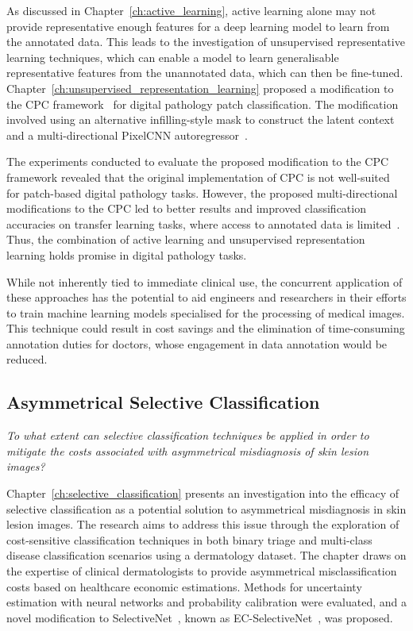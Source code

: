 As discussed in Chapter~\ref{ch:active_learning}, active learning alone may not provide representative enough features for a deep learning model to learn from the annotated data. This leads to the investigation of unsupervised representative learning techniques, which can enable a model to learn generalisable representative features from the unannotated data, which can then be fine-tuned. Chapter~\ref{ch:unsupervised_representation_learning} proposed a modification to the CPC framework~\citep{oord2018representation} for digital pathology patch classification. The modification involved using an alternative infilling-style mask to construct the latent context and a multi-directional PixelCNN autoregressor~\citep{oord2016pixel}.

The experiments conducted to evaluate the proposed modification to the CPC framework revealed that the original implementation of CPC is not well-suited for patch-based digital pathology tasks. However, the proposed multi-directional modifications to the CPC led to better results and improved classification accuracies on transfer learning tasks, where access to annotated data is limited~\citep{carse2021unsupervised}. Thus, the combination of active learning and unsupervised representation learning holds promise in digital pathology tasks.

While not inherently tied to immediate clinical use, the concurrent application of these approaches has the potential to aid engineers and researchers in their efforts to train machine learning models specialised for the processing of medical images. This technique could result in cost savings and the elimination of time-consuming annotation duties for doctors, whose engagement in data annotation would be reduced.

\subsection{Asymmetrical Selective Classification}
\textit{To what extent can selective classification techniques be applied in order to mitigate the costs associated with asymmetrical misdiagnosis of skin lesion images?}

Chapter~\ref{ch:selective_classification} presents an investigation into the efficacy of selective classification as a potential solution to asymmetrical misdiagnosis in skin lesion images. The research aims to address this issue through the exploration of cost-sensitive classification techniques in both binary triage and multi-class disease classification scenarios using a dermatology dataset. The chapter draws on the expertise of clinical dermatologists to provide asymmetrical misclassification costs based on healthcare economic estimations. Methods for uncertainty estimation with neural networks and probability calibration were evaluated, and a novel modification to SelectiveNet~\citep{geifman2019selectivenet}, known as EC-SelectiveNet~\citep{carse2021robust}, was proposed. 

